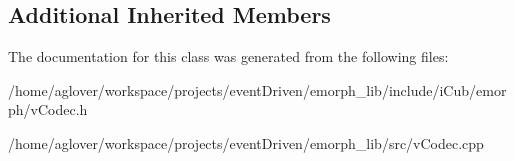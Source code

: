 \subsection*{Additional Inherited Members}


The documentation for this class was generated from the following files\-:\begin{DoxyCompactItemize}
\item 
/home/aglover/workspace/projects/event\-Driven/emorph\-\_\-lib/include/i\-Cub/emorph/v\-Codec.\-h\item 
/home/aglover/workspace/projects/event\-Driven/emorph\-\_\-lib/src/v\-Codec.\-cpp\end{DoxyCompactItemize}
